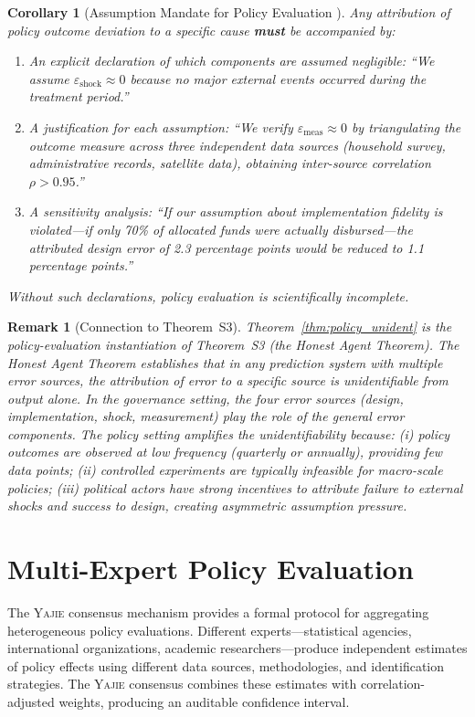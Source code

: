 \documentclass[11pt,a4paper]{article}
\newtheorem{corollary}[theorem]{Corollary}
\newtheorem{remark}[theorem]{Remark}
\theoremstyle{definition}
\newcommand{\Yajie}{\textsc{Yajie}}
\newcommand{\ThmSCXHonest}{Theorem~S3}
\begin{document}
\begin{corollary}[Assumption Mandate for Policy Evaluation ]
\label{cor:assumption_mandate_policy}
Any attribution of policy outcome deviation to a specific cause \textbf{must} be accompanied by:
\begin{enumerate}[label=(\roman*)]
    \item An explicit declaration of which components are assumed negligible: ``We assume $\varepsilon_{\mathrm{shock}} \approx 0$ because no major external events occurred during the treatment period.''
    \item A justification for each assumption: ``We verify $\varepsilon_{\mathrm{meas}} \approx 0$ by triangulating the outcome measure across three independent data sources (household survey, administrative records, satellite data), obtaining inter-source correlation $\rho > 0.95$.''
    \item A sensitivity analysis: ``If our assumption about implementation fidelity is violated---if only 70\% of allocated funds were actually disbursed---the attributed design error of 2.3 percentage points would be reduced to 1.1 percentage points.''
\end{enumerate}
Without such declarations, policy evaluation is scientifically incomplete.
\end{corollary}
\begin{remark}[Connection to \ThmSCXHonest]
\label{rem:honest_policy}
Theorem~\ref{thm:policy_unident} is the policy-evaluation instantiation of \ThmSCXHonest{} (the Honest Agent Theorem). The Honest Agent Theorem establishes that in any prediction system with multiple error sources, the attribution of error to a specific source is unidentifiable from output alone. In the governance setting, the four error sources (design, implementation, shock, measurement) play the role of the general error components. The policy setting amplifies the unidentifiability because: (i) policy outcomes are observed at low frequency (quarterly or annually), providing few data points; (ii) controlled experiments are typically infeasible for macro-scale policies; (iii) political actors have strong incentives to attribute failure to external shocks and success to design, creating asymmetric assumption pressure.
\end{remark}
\section{Multi-Expert Policy Evaluation}
\label{sec:multiexpert}
The \Yajie{} consensus mechanism provides a formal protocol for aggregating heterogeneous policy evaluations. Different experts---statistical agencies, international organizations, academic researchers---produce independent estimates of policy effects using different data sources, methodologies, and identification strategies. The \Yajie{} consensus combines these estimates with correlation-adjusted weights, producing an auditable confidence interval.
\end{document}
